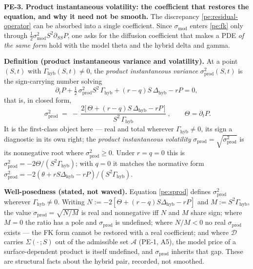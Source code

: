 \documentclass[11pt,a4paper]{article}
\newcommand{\pelabel}[1]{\leavevmode\hypertarget{pe-#1}{}%
  \marginpar{\raggedright\scriptsize\ttfamily\textcolor{gray}{#1}}}
\newcommand{\smod}{\sigma_{\mathrm{mod}}}
\newcommand{\sprod}{\sigma_{\mathrm{prod}}}
\newcommand{\Dhyb}{\Delta_{\mathrm{hyb}}}
\newcommand{\Ghyb}{\Gamma_{\mathrm{hyb}}}
\begin{document}
\pelabel{PE-3}\textbf{PE-3. Product instantaneous volatility: the coefficient
that restores the equation, and why it need not be smooth.} The discrepancy
\eqref{pe:residual-operator} can be absorbed into a single coefficient. Since
$\smod$ enters \eqref{pe:fk} only through $\tfrac12\smod^2S^2\partial_{SS}P$,
one asks for the diffusion coefficient that makes a PDE \emph{of the same form}
hold with the model theta and the hybrid delta and gamma.

\textbf{Definition (product instantaneous variance and volatility).} At a point
$(S,t)$ with $\Ghyb(S,t)\neq 0$, the \emph{product instantaneous variance}
$\sprod^2(S,t)$ is the sign-carrying number solving
\begin{equation}\label{pe:sprod-pde}
  \partial_t P + \tfrac12\,\sprod^2 S^2\,\Ghyb + (r-q)S\,\Dhyb - rP = 0 ,
\end{equation}
that is, in closed form,
\begin{equation}\label{pe:sprod}
  \boxed{\;
  \sprod^2 \;=\; -\,\frac{2\bigl[\,\Theta + (r-q)S\,\Dhyb - rP\,\bigr]}{S^2\,\Ghyb}
  \;,}\qquad \Theta = \partial_t P .
\end{equation}
It is the first-class object here --- real and total wherever $\Ghyb\neq0$, its
sign a diagnostic in its own right; the \emph{product instantaneous volatility}
$\sprod=\sqrt{\sprod^2}$ is its nonnegative root where $\sprod^2\ge0$. Under
$r=q=0$ this is $\sprod^2 = -2\Theta/(S^2\Ghyb)$; with $q=0$ it matches
the normative form $\sprod^2 = -2(\theta + rS\Dhyb - rP)/(S^2\Ghyb)$.

\textbf{Well-posedness (stated, not waved).} Equation \eqref{pe:sprod} defines
$\sprod^2$ wherever $\Ghyb\neq0$. Writing $N := -2[\Theta+(r-q)S\Dhyb-rP]$ and
$M := S^2\Ghyb$, the value $\sprod=\sqrt{N/M}$ is real and nonnegative iff $N$
and $M$ share sign; where $M=0$ the ratio has a pole and $\sprod$ is undefined;
where $N/M<0$ no real $\sprod$ exists --- the FK form cannot be restored with a
real coefficient; and where $\mathcal{D}$ carries $\Sigma(\cdot\,;S)$ out of the
admissible set $\mathcal{A}$ (PE-1, A5), the model price of a surface-dependent
product is itself undefined, and $\sprod$ inherits that gap. These are
structural facts about the hybrid pair, recorded, not smoothed.
\end{document}

